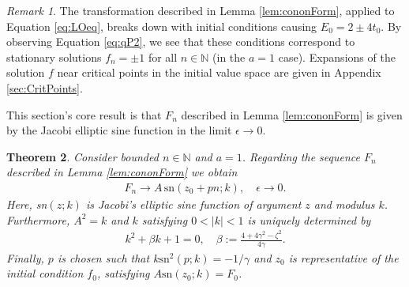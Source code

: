 \documentclass[reqno,a4paper]{amsart}
\numberwithin{equation}{section}
\theoremstyle{plain}
\newtheorem{theorem}{Theorem}[section]
\theoremstyle{remark}
\newtheorem{remark}[theorem]{Remark}
\begin{document}
\begin{remark}
    The transformation described in Lemma \ref{lem:cononForm}, applied to Equation \eqref{eq:LOeq}, breaks down with initial conditions causing $E_0=2\pm4t_0$. By observing Equation \eqref{eq:qP2}, we see that these conditions correspond to stationary solutions $f_n=\pm1$ for all $n\in\mathbb{N}$ (in the $a=1$ case). Expansions of the solution $f$ near critical points in the initial value space are given in Appendix \ref{sec:CritPoints}.
\end{remark}
This section's core result is that $F_n$ described in Lemma \ref{lem:cononForm} is given by the Jacobi elliptic sine function in the limit $\epsilon\to0$.
\begin{theorem}\label{thrm:elliptic}
    Consider bounded $n\in\mathbb{N}$ and  $a=1$. Regarding the sequence $F_n$ described in Lemma \ref{lem:cononForm} we obtain
    \begin{align*}
        F_n\to A\,\text{sn}(z_0+pn;k),\quad\epsilon\rightarrow0.
    \end{align*}
    Here, sn$(z;k)$ is Jacobi's elliptic sine function of argument $z$ and modulus $k$. Furthermore, $A^2=k$ and $k$ satisfying $0<|k|<1$ is uniquely determined by
    \begin{align*}
        k^2+\beta k+1=0,\quad \beta:=\frac{4+4\gamma^2-\zeta^2}{4\gamma}.
    \end{align*}
    Finally, $p$ is chosen such that $k\text{sn}^2(p;k)=-1/\gamma$ and $z_0$ is representative of the initial condition $f_0$, satisfying $A\text{sn}(z_0;k)=F_0$.
\end{theorem}
\end{document}
